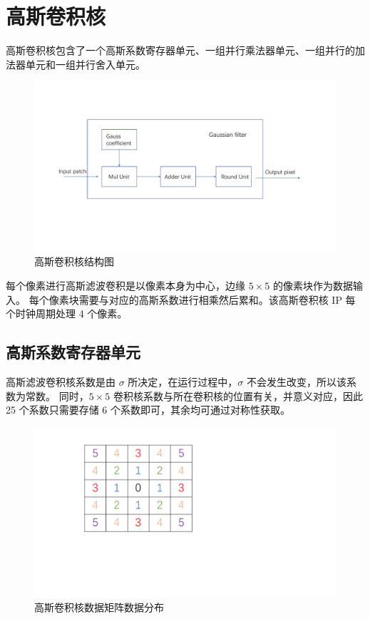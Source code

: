 \documentclass[12pt, a4paper, oneside]{ctexbook}
\begin{document}
	\section{高斯卷积核}
	高斯卷积核包含了一个高斯系数寄存器单元、一组并行乘法器单元、一组并行的加法器单元和一组并行舍入单元。
		\begin{figure}[h]
			\centering
			\includegraphics[scale=0.55]{pic/gaussian_filter}
			\caption{高斯卷积核结构图}
			\label{fig:gaussianfilter}
		\end{figure}
	每个像素进行高斯滤波卷积是以像素本身为中心，边缘 $5\times5$ 的像素块作为数据输入。
	每个像素块需要与对应的高斯系数进行相乘然后累和。该高斯卷积核 IP 每个时钟周期处理 4 个像素。
	\subsection{高斯系数寄存器单元}
	高斯滤波卷积核系数是由 $\sigma$ 所决定，在运行过程中，$\sigma$ 不会发生改变，所以该系数为常数。
	同时，$5\times5$ 卷积核系数与所在卷积核的位置有关，并意义对应，因此 25 个系数只需要存储 6 个系数即可，其余均可通过对称性获取。
	\begin{figure}[h]
		\centering
		\includegraphics[scale=0.4]{pic/number}
		\caption{高斯卷积核数据矩阵数据分布}
		\label{fig:number}
	\end{figure}
\end{document}
